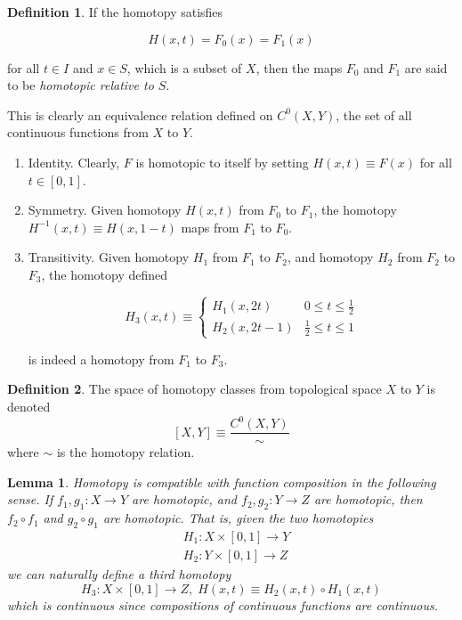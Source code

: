\documentclass{article}
\newtheorem{lemma}[theorem]{Lemma}
\theoremstyle{remark}
\theoremstyle{definition}
\newtheorem{definition}{Definition}[section]
\begin{document}
  \begin{definition}
    If the homotopy satisfies 

      \[H(x,t) = F_0 (x) = F_1 (x)\]

    for all $t \in I$ and $x \in S$, which is a subset of $X$, then the maps $F_0$ and $F_1$ are said to be \textit{homotopic relative to $S$}. 
  \end{definition}

  This is clearly an equivalence relation defined on $C^0 (X, Y)$, the set of all continuous functions from $X$ to $Y$.
  \begin{enumerate}
    \item Identity. Clearly, $F$ is homotopic to itself by setting $H(x, t) \equiv F(x)$ for all $t \in [0,1]$. 

    \item Symmetry. Given homotopy $H(x, t)$ from $F_0$ to $F_1$, the homotopy $H^{-1} (x, t) \equiv H(x, 1-t)$ maps from $F_1$ to $F_0$. 

    \item Transitivity. Given homotopy $H_1$ from $F_1$ to $F_2$, and homotopy $H_2$ from $F_2$ to $F_3$, the homotopy defined

    \[H_3 (x, t) \equiv \begin{cases}
          H_1 (x, 2t) & 0 \leq t \leq \frac{1}{2} \\
          H_2 (x, 2t - 1) & \frac{1}{2} \leq t \leq 1
    \end{cases}\]

    is indeed a homotopy from $F_1$ to $F_3$. 
  \end{enumerate}

  \begin{definition}
  The space of homotopy classes from topological space $X$ to $Y$ is denoted
  \[[X, Y] \equiv \frac{C^0 (X, Y)}{\sim}\]
  where $\sim$ is the homotopy relation. 
  \end{definition}

  \begin{lemma}
  Homotopy is compatible with function composition in the following sense. If $f_1, g_1: X \longrightarrow Y$ are homotopic, and $f_2, g_2: Y \longrightarrow Z$ are homotopic, then $f_2 \circ f_1$ and $g_2 \circ g_1$ are homotopic. That is, given the two homotopies
  \begin{align*}
      & H_1: X \times [0,1] \longrightarrow Y \\
      & H_2: Y \times [0,1] \longrightarrow Z
  \end{align*}
  we can naturally define a third homotopy 
  \[H_3: X \times [0,1] \longrightarrow Z, \; H(x, t) \equiv H_2 (x, t) \circ H_1(x, t)\]
  which is continuous since compositions of continuous functions are continuous. 
  \end{lemma}
\end{document}
